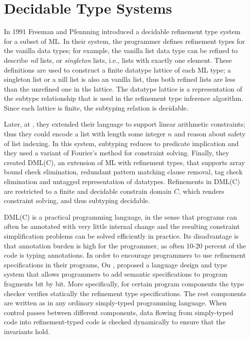 \newcommand\qset{\ensuremath{\mathbb{Q}}\xspace}
\newcommand\NV[1]{\columnbreak}


\section{Decidable Type Systems}\label{sec:liquid}
In 1991 Freeman and Pfennning \cite{FreemanPfenning91} introduced
a decidable refinement type system for a subset of ML.
%
In their system, the programmer defines refinement
types for the vanilla data types; 
for example, the vanilla 
list data type can be refined to 
describe \textit{nil} lists, or \textit{singleton} lists, i.e., lists
with exactly one element.
%
These definitions are used to 
construct a finite datatype lattice of each ML type;
a singleton list or a nill list is
also an vanilla list, thus both refined lists are 
less than the unrefined one in the lattice.
%
The datatype lattice is a representation of the subtype
relationship that is used in the 
refinement type inference algorithm. 
Since each lattice is finite, the 
subtyping relation is decidable.

Later, at \cite{pfenningxi98}, 
they extended their language to support
linear arithmetic constraints; thus they could
encode a list with length some integer $n$ and 
reason about safety of list indexing.
In this system, subtyping reduces to predicate implication
and they used a variant of Fourier's method \cite{OmegaTestCACM} 
for constraint solving.
%
Finally, they created DML(C)\cite{XiPfenning99}, 
an extension of ML with refinement types, that supports 
array bound check elimination,
redundant pattern matching clause removal, 
tag check elimination and untagged representation of datatypes.
%
Refinements in DML(C) are restricted to a finite and decidable
constrain domain $C$, 
which renders constraint solving, and thus subtyping decidable.
%

DML(C)  is a practical programming language, in the sense that 
programs can often be annotated with
very little internal change and the resulting
constraint simplification problems can be solved efficiently
in practice. 
%
Its disadvantage is that annotation burden is high for the programmer,  
as often 10-20 percent of
the code is typing annotations.
%
In order to encourage programmers to use refinement specifications in their programs,
Ou \etal \cite{Ou2004}, proposed a language design and type system that allows programmers to add
semantic specifications to program fragments bit by bit. 
More specifically, for certain program components the type checker verifies
statically the refinement type specifications.
%
The rest components are written as in any ordinary simply-typed programming language. 
When control passes between different components, data flowing
from simply-typed code into refinement-typed code is checked dynamically 
to ensure that the invariants hold.
%

